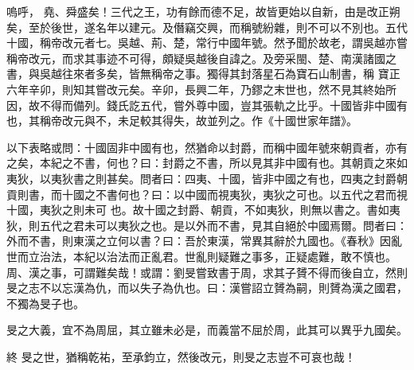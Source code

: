 
\begin{pinyinscope}

 嗚呼，
 堯、舜盛矣！三代之王，功有餘而德不足，故皆更始以自新，由是改正朔矣，至於後世，遂名年以建元。及僭竊交興，而稱號紛雜，則不可以不別也。五代十國，稱帝改元者七。吳越、荊、楚，常行中國年號。然予聞於故老，謂吳越亦嘗稱帝改元，而求其事迹不可得，頗疑吳越後自諱之。及旁采閩、楚、南漢諸國之書，與吳越往來者多矣，皆無稱帝之事。獨得其封落星石為寶石山制書，稱
 寶正六年辛卯，則知其嘗改元矣。辛卯，長興二年，乃鏐之末世也，然不見其終始所因，故不得而備列。錢氏訖五代，嘗外尊中國，豈其張軌之比乎。十國皆非中國有也，其稱帝改元與不，未足較其得失，故並列之。作《十國世家年譜》。



 以下表略或問：十國固非中國有也，然猶命以封爵，而稱中國年號來朝貢者，亦有之矣，本紀之不書，何也？曰：封爵之不書，所以見其非中國有也。其朝貢之來如夷狄，以夷狄書之則甚矣。問者曰：四夷、十國，皆非中國之有也，四夷之封爵朝貢則書，而十國之不書何也？曰：以中國而視夷狄，夷狄之可也。以五代之君而視十國，夷狄之則未可
 也。故十國之封爵、朝貢，不如夷狄，則無以書之。書如夷狄，則五代之君未可以夷狄之也。是以外而不書，見其自絕於中國焉爾。問者曰：外而不書，則東漢之立何以書？曰：吾於東漢，常異其辭於九國也。《春秋》因亂世而立治法，本紀以治法而正亂君。世亂則疑難之事多，正疑處難，敢不慎也。周、漢之事，可謂難矣哉！或謂：劉旻嘗致書于周，求其子贇不得而後自立，然則旻之志不以忘漢為仇，而以失子為仇也。曰：漢嘗詔立贇為嗣，則贇為漢之國君，不獨為旻子也。



 旻之大義，宜不為周屈，其立雖未必是，而義當不屈於周，此其可以異乎九國矣。



 終
 旻之世，猶稱乾祐，至承鈞立，然後改元，則旻之志豈不可哀也哉！




\end{pinyinscope}
